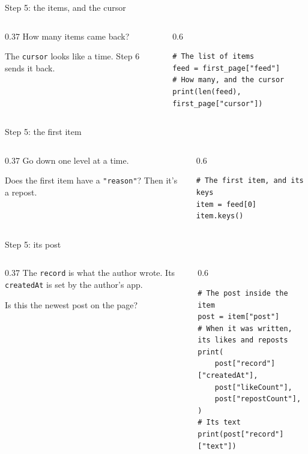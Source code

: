 \documentclass[9pt,aspectratio=169]{beamer}
\begin{document}
\begin{frame}[fragile]{Step 5: the items, and the cursor}
    \begin{columns}[T]
        \begin{column}{0.37\textwidth}
            How many items came back?

            \medskip
            The \texttt{cursor} looks like a time. Step 6 sends it back.
        \end{column}
        \begin{column}{0.6\textwidth}
\begin{lstlisting}
# The list of items
feed = first_page["feed"]
# How many, and the cursor
print(len(feed), first_page["cursor"])
\end{lstlisting}
        \end{column}
    \end{columns}
\end{frame}

\begin{frame}[fragile]{Step 5: the first item}
    \begin{columns}[T]
        \begin{column}{0.37\textwidth}
            Go down one level at a time.

            \medskip
            Does the first item have a \texttt{"reason"}? Then it's a repost.
        \end{column}
        \begin{column}{0.6\textwidth}
\begin{lstlisting}
# The first item, and its keys
item = feed[0]
item.keys()
\end{lstlisting}
        \end{column}
    \end{columns}
\end{frame}

\begin{frame}[fragile]{Step 5: its post}
    \begin{columns}[T]
        \begin{column}{0.37\textwidth}
            The \texttt{record} is what the author wrote. Its \texttt{createdAt} is set by the author's app.

            \medskip
            Is this the newest post on the page?
        \end{column}
        \begin{column}{0.6\textwidth}
\begin{lstlisting}
# The post inside the item
post = item["post"]
# When it was written, its likes and reposts
print(
    post["record"]["createdAt"],
    post["likeCount"],
    post["repostCount"],
)
# Its text
print(post["record"]["text"])
\end{lstlisting}
        \end{column}
    \end{columns}
\end{frame}
\end{document}
